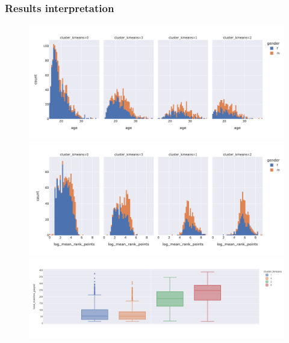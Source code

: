\subsubsection{Results interpretation}
\begin{figure}[!h]
	\centering
	\begin{minipage}{.45\textwidth}
		\centering
		\includegraphics[width=\textwidth]{plots/kmeans/hist_age.png}
	\end{minipage}
	\begin{minipage}{.45\textwidth}
		\centering
		\includegraphics[width=\textwidth]{plots/kmeans/hist_log_mean_rank_points.png}
	\end{minipage}
	\begin{minipage}{.45\textwidth}
		\centering
		\includegraphics[width=\textwidth]{plots/kmeans/kmeans-box-plot-matches-played.png}

\end{minipage}
\end{figure}
